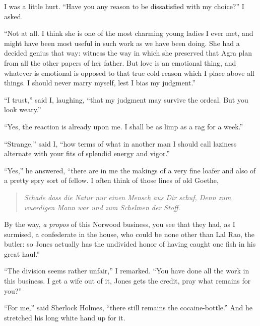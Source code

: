 \documentclass[12pt,english,oneside]{book}
\begin{document}
I was a little hurt. {}``Have you any reason to be dissatisfied with
my choice?'' I asked.

{}``Not at all. I think she is one of the most charming young ladies
I ever met, and might have been most useful in such work as we have
been doing. She had a decided genius that way: witness the way in
which she preserved that Agra plan from all the other papers of her
father. But love is an emotional thing, and whatever is emotional
is opposed to that true cold reason which I place above all things.
I should never marry myself, lest I bias my judgment.''

{}``I trust,'' said I, laughing, {}``that my judgment may survive
the ordeal. But you look weary.''

{}``Yes, the reaction is already upon me. I shall be as limp as a
rag for a week.''

{}``Strange,'' said I, {}``how terms of what in another man I should
call laziness alternate with your fits of splendid energy and vigor.''

{}``Yes,'' he answered, {}``there are in me the makings of a very
fine loafer and also of a pretty spry sort of fellow. I often think
of those lines of old Goethe,\mdsh{---}

\begin{quote}
\emph{Schade dass die Natur nur} \textit{einen} \emph{Mensch aus Dir
schuf, Denn zum wuerdigen Mann war und zum Schelmen der Stoff.}
\end{quote}
By the way, \emph{a propos} of this Norwood business, you see that
they had, as I surmised, a confederate in the house, who could be
none other than Lal Rao, the butler: so Jones actually has the undivided
honor of having caught one fish in his great haul.''

{}``The division seems rather unfair,'' I remarked. {}``You have
done all the work in this business. I get a wife out of it, Jones
gets the credit, pray what remains for you?''

{}``For me,'' said Sherlock Holmes, {}``there still remains the
cocaine-bottle.'' And he stretched his long white hand up for it.
\end{document}
